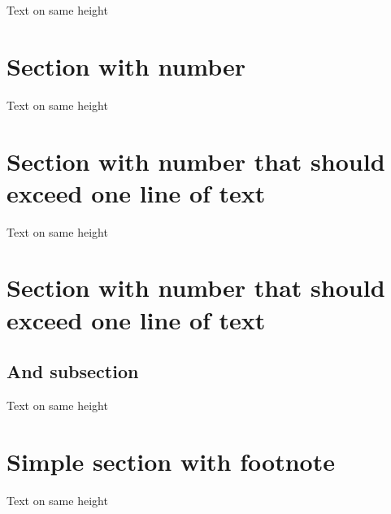 \documentclass{kapital}
\begin{document}
  \mainmatter
  

  Text on same height
  
  \section{Section with number}

  Text on same height

  \section{Section with number that should exceed one line of text}

  Text on same height

  \section{Section with number that should exceed one line of text}
  \subsection{And subsection}

  Text on same height

  \section[Simple section with footnote]{Simple section with footnote\footnotemark}

  Text on same height
\end{document}

